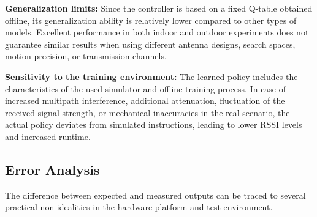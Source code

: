 \textbf{Generalization limits:}
Since the controller is based on a fixed Q-table obtained offline, its generalization ability is relatively lower compared to other types of models. Excellent performance in both indoor and outdoor experiments does not guarantee similar results when using different antenna designs, search spaces, motion precision, or transmission channels.

\textbf{Sensitivity to the training environment:}
The learned policy includes the characteristics of the used simulator and offline training process. In case of increased multipath interference, additional attenuation, fluctuation of the received signal strength, or mechanical inaccuracies in the real scenario, the actual policy deviates from simulated instructions, leading to lower RSSI levels and increased runtime.

\subsection{Error Analysis}

The difference between expected and measured outputs can be traced to several practical
non-idealities in the hardware platform and test environment.

